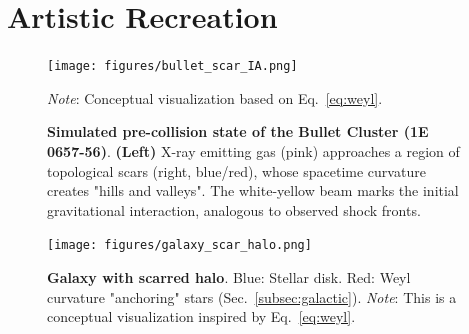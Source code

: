 \documentclass{article}
\begin{document}
\section{Artistic Recreation}
\label{sec:art}
\begin{figure}[H]  
  \centering  
  \texttt{[image: figures/bullet\_scar\_IA.png]}  
  \caption{
    \textbf{Simulated pre-collision state of the Bullet Cluster (1E 0657-56)}. 
    \textbf{(Left)} X-ray emitting gas (pink) approaches a region of topological scars (right, blue/red), 
    whose spacetime curvature creates "hills and valleys". The white-yellow beam marks the initial 
    gravitational interaction, analogous to observed shock fronts.}
    \textit{Note}: Conceptual visualization based on Eq.~\ref{eq:weyl}.
  \label{fig:bullet_scar}  
\end{figure}  
\FloatBarrier
\begin{figure}[H]  
  \centering  
  \texttt{[image: figures/galaxy\_scar\_halo.png]}  
  \caption{  
    \textbf{Galaxy with scarred halo}. Blue: Stellar disk. Red: Weyl curvature "anchoring" stars (Sec.~\ref{subsec:galactic}).  
    \textit{Note}: This is a conceptual visualization inspired by Eq.~\ref{eq:weyl}.  }
  \label{fig:scar_halo_art}  
\end{figure}  
\end{document}
